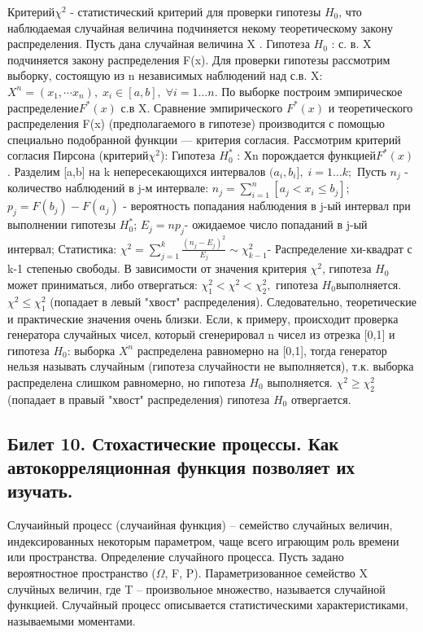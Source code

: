 \documentclass[a4paper, 12pt]{article}
\begin{document}
	Критерий$ \chi^2$ - статистический критерий для проверки гипотезы  $H_0$, что наблюдаемая случайная величина подчиняется некому теоретическому закону распределения.
	Пусть дана случайная величина X .
	Гипотеза  $H_0$ : с. в. X подчиняется закону распределения F(x).
	Для проверки гипотезы рассмотрим выборку, состоящую из n независимых наблюдений над с.в. X: $ X^n = \left( x_1, \cdots x_n \right), \; x_i \in \left[ a, b \right], \; \forall i=1 \dots n $. По выборке построим эмпирическое распределение$ F^*(x)$ с.в X. Сравнение эмпирического $F^*(x)$ и теоретического распределения F(x) (предполагаемого в гипотезе) производится с помощью специально подобранной функции — критерия согласия. Рассмотрим критерий согласия Пирсона (критерий$ \chi^2$):
	Гипотеза  $H_0^*$ : Хn порождается функцией$ F^*(x)$.
	Разделим [a,b] на k непересекающихся интервалов  $(a_i, b_i], \; i=1 \dots k;$
	Пусть $n_j$ - количество наблюдений в j-м интервале:  $n_j = \sum_{i=1}^n \left[ a_j <x_i \leq b_j \right] $;
	$p_j = F(b_j)-F(a_j)$ - вероятность попадания наблюдения в j-ый интервал при выполнении гипотезы  $H_0^* $;
	$E_j = np_j $- ожидаемое число попаданий в j-ый интервал;
	Статистика: $\chi^2 = \sum_{j=1}^k \frac{ \left( n_j-E_j \right)^2}{E_j} \sim \chi_{k-1}^2 $- Распределение хи-квадрат с k-1 степенью свободы.
	В зависимости от значения критерия $\chi^2$, гипотеза $H_0 $может приниматься, либо отвергаться:
	$\chi^2_1 < \chi^2 < \chi^2_2,$ гипотеза $H_0 $выполняется.
	$\chi^2 \leq \chi^2_1$ (попадает в левый "хвост" распределения). Следовательно, теоретические и практические значения очень близки. Если, к примеру, происходит проверка генератора случайных чисел, который сгенерировал n чисел из отрезка [0,1] и гипотеза $H_0$: выборка $X^n$ распределена равномерно на [0,1], тогда генератор нельзя называть случайным (гипотеза случайности не выполняется), т.к. выборка распределена слишком равномерно, но гипотеза $H_0$ выполняется.
	$\chi^2 \geq \chi^2_2$ (попадает в правый "хвост" распределения) гипотеза $H_0$ отвергается.
	
	\subsection*{Билет 10.  Стохастические процессы. Как автокорреляционная функция позволяет их изучать.}
	Случаийный процесс (случаийная функция) – семейство случайных величин, индексированных некоторым параметром, чаще всего играющим роль времени или пространства.
	Определение случайного процесса.
	Пусть задано вероятностное пространство ($\Omega$, F, P). Параметризованное семейство X случйных величин, где T – произвольное множество, называется случайной функцией.
	Случайный процесс описывается статистическими характеристиками, называемыми моментами.
	
\end{document}
